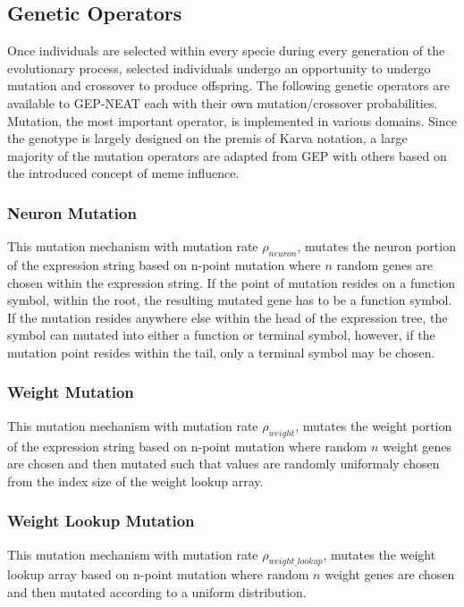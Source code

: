 \subsection{Genetic Operators}
Once individuals are selected within every specie during every generation of the evolutionary process, selected individuals undergo an opportunity to undergo mutation and crossover to produce offspring. The following genetic operators are available to GEP-NEAT each with their own mutation/crossover probabilities. 
Mutation, the most important operator, is implemented in various domains. Since the genotype is largely designed on the premis of Karva notation, a large majority of the mutation operators are adapted from GEP with others based on the introduced concept of meme influence.

\subsubsection{Neuron Mutation}
This mutation mechanism with mutation rate $\rho_{neuron}$, mutates the neuron portion of the expression string based on n-point mutation where $n$ random genes are chosen within the expression string. If the point of mutation resides on a function symbol, within the root, the resulting mutated gene has to be a function symbol. If the mutation resides anywhere else within the head of the expression tree, the symbol can mutated into either a function or terminal symbol, however, if the mutation point resides within the tail, only a terminal symbol may be chosen.

\subsubsection{Weight Mutation}
This mutation mechanism with mutation rate $\rho_{weight}$, mutates the weight portion of the expression string based on n-point mutation where random $n$ weight genes are chosen and then mutated such that values are randomly uniformaly chosen from the index size of the weight lookup array.

\subsubsection{Weight Lookup Mutation}
This mutation mechanism with mutation rate $\rho_{weight\_lookup}$, mutates the weight lookup array based on n-point mutation where random $n$ weight genes are chosen and then mutated according to a uniform distribution.

